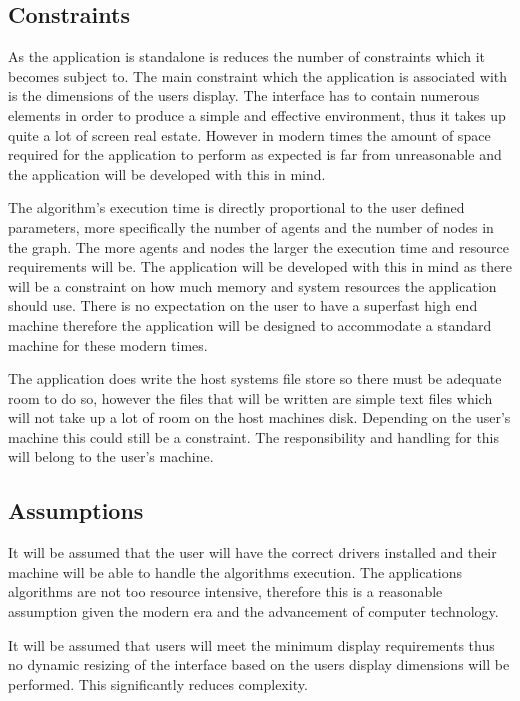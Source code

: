 \subsection{Constraints}

As the application is standalone is reduces the number of constraints which it becomes subject to. The main constraint which the application is associated with is the dimensions of the users display. The interface has to contain numerous elements in order to produce a simple and effective environment, thus it takes up quite a lot of screen real estate. However in modern times the amount of space required for the application to perform as expected is far from unreasonable and the application will be developed with this in mind.

The algorithm’s execution time is directly proportional to the user defined parameters, more specifically the number of agents and the number of nodes in the graph. The more agents and nodes the larger the execution time and resource requirements will be. The application will be developed with this in mind as there will be a constraint on how much memory and system resources the application should use. There is no expectation on the user to have a superfast high end machine therefore the application will be designed to accommodate a standard machine for these modern times.

The application does write the host systems file store so there must be adequate room to do so, however the files that will be written are simple text files which will not take up a lot of room on the host machines disk. Depending on the user’s machine this could still be a constraint. The responsibility and handling for this will belong to the user’s machine.

\subsection{Assumptions}

It will be assumed that the user will have the correct drivers installed and their machine will be able to handle the algorithms execution. The applications algorithms are not too resource intensive, therefore this is a reasonable assumption given the modern era and the advancement of computer technology.

It will be assumed that users will meet the minimum display requirements thus no dynamic resizing of the interface based on the users display dimensions will be performed. This significantly reduces complexity.

